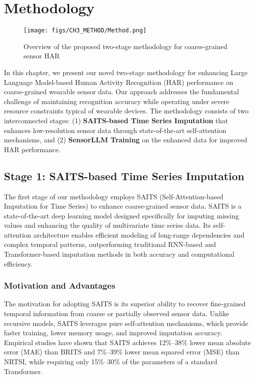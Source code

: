 \chapter{Methodology}

\begin{figure}[H]
    \centering
    \texttt{[image: figs/CH3\_METHOD/Method.png]}
    \caption{Overview of the proposed two-stage methodology for coarse-grained sensor HAR}
    \label{fig:methodology-overview}
\end{figure}

\hspace{2em}In this chapter, we present our novel two-stage methodology for enhancing Large Language Model-based Human Activity Recognition (HAR) performance on coarse-grained wearable sensor data. Our approach addresses the fundamental challenge of maintaining recognition accuracy while operating under severe resource constraints typical of wearable devices. The methodology consists of two interconnected stages: (1) \textbf{SAITS-based Time Series Imputation} that enhances low-resolution sensor data through state-of-the-art self-attention mechanisms, and (2) \textbf{SensorLLM Training} on the enhanced data for improved HAR performance.

\section{Stage 1: SAITS-based Time Series Imputation}

\hspace{2em}The first stage of our methodology employs SAITS (Self-Attention-based Imputation for Time Series) to enhance coarse-grained sensor data. SAITS is a state-of-the-art deep learning model designed specifically for imputing missing values and enhancing the quality of multivariate time series data. Its self-attention architecture enables efficient modeling of long-range dependencies and complex temporal patterns, outperforming traditional RNN-based and Transformer-based imputation methods in both accuracy and computational efficiency.

\subsection{Motivation and Advantages}

\hspace{2em}The motivation for adopting SAITS is its superior ability to recover fine-grained temporal information from coarse or partially observed sensor data. Unlike recursive models, SAITS leverages pure self-attention mechanisms, which provide faster training, lower memory usage, and improved imputation accuracy. Empirical studies have shown that SAITS achieves 12\%--38\% lower mean absolute error (MAE) than BRITS and 7\%--39\% lower mean squared error (MSE) than NRTSI, while requiring only 15\%--30\% of the parameters of a standard Transformer.

